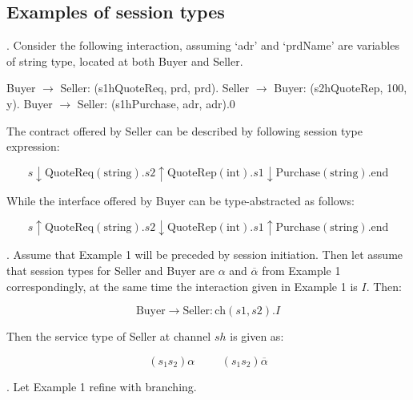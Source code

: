 \subsection{Examples of session types}

. Consider the following interaction, assuming `adr' and `prdName' are variables of string type, located at both Buyer and Seller.

\begin{algorithm*}
\begin{algorithmic}[1]
\State Buyer $\rightarrow$ Seller: (s1hQuoteReq, prd, prd).
\State Seller $\rightarrow$ Buyer: (s2hQuoteRep, 100, y).
\State Buyer $\rightarrow$ Seller: (s1hPurchase, adr, adr).0
\end{algorithmic}
\end{algorithm*}

The contract offered by Seller can be described by following session type expression:

\begin{equation*}
s \downarrow \text{QuoteReq}(\text{string}).s2 \uparrow \text{QuoteRep}(\text{int}).s1 \downarrow \text{Purchase}(\text{string}).\text{end}
\end{equation*}

While the interface offered by Buyer can be type-abstracted as follows:

\begin{equation*}
s \uparrow \text{QuoteReq}(\text{string}).s2 \downarrow \text{QuoteRep}(\text{int}).s1 \uparrow \text{Purchase}(\text{string}).\text{end}
\end{equation*}

. Assume that Example 1 will be preceded by session initiation. Then let assume that session types for Seller and Buyer are $\alpha$ and $\overline{\alpha}$ from Example 1 correspondingly, at the same time the interaction given in Example 1 is $I$. Then:

\begin{equation*}
\text{Buyer} \rightarrow \text{Seller} : \text{ch}(s1,s2).I
\end{equation*}

Then the service type of Seller at channel $sh$ is given as:

\begin{equation*}
(s_1s_2)\alpha \hspace{1cm} (s_1s_2)\overline{\alpha}
\end{equation*}

. Let Example 1 refine with branching.

